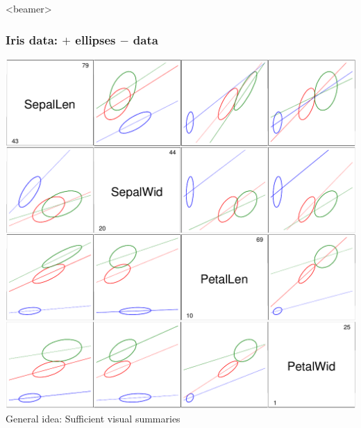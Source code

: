 \begin{frame}<beamer>
  \frametitle{Iris data: \scatmat $+$  ellipses $-$ data}
  \begin{center}
  \includegraphics[height=.8\textheight,clip]{fig/scatirisd3}
  \\ General idea: Sufficient visual summaries
  \end{center}
\end{frame}

